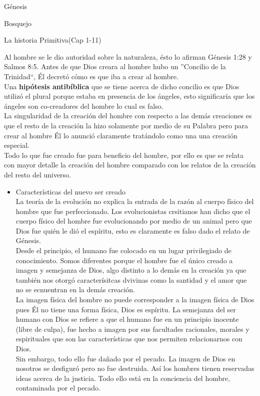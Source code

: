 \begin{section}{Génesis}
\begin{subsection}{Bosquejo}
\begin{subsubsection}{La historia Primitiva(Cap 1-11)}
\begin{enumerate}
\begin{itemize}
Al hombre se le dio autoridad sobre la naturaleza, ésto lo afirman Génesis 1:28 y Salmos 8:5. Antes de que Dios	creara al hombre hubo un ''Concilio de la Trinidad``, Él decretó cómo es que iba a crear al hombre.\\
				Una \textbf{hipótesis antibíblica} que se tiene acerca de dicho concilio es que Dios utilizó el plural porque estaba en presencia de los ángeles, esto significaría que los ángeles son co-creadores del hombre lo cual es falso.\\
					La singularidad de la creación del hombre con respecto a las demás creaciones es que el resto 						de la creación la hizo solamente por medio de su Palabra pero para crear al hombre Él lo anunció claramente tratándolo como una una creación especial.\\
					Todo lo que fue creado fue para beneficio del hombre, por ello es que se relata con mayor detalle la creación del hombre comparado con los relatos de la creación del resto del universo.
					\begin{itemize}
					\item Características del nuevo ser creado\\
					La teoría de la evolución no explica la entrada de la razón al cuerpo físico del hombre que 						fue perfeccionado. Los evolucionistas crsitianos han dicho que el cuerpo físico del hombre 						fue evolucionando por medio de un animal pero que Dios fue quién le dió el espíritu, esto es claramente es falso dado el relato de Génesis.\\
					Desde el principio, el humano fue colocado en un lugar privilegiado de conocimiento. Somos 						diferentes porque el hombre fue el único creado a imagen y semejanza de Dios, algo distinto a 						lo demás en la creación ya que también nos otorgó caracterísitcas dvivinas como la santidad y el amor que no se ecnuentran en la demás creación.\\
					La imagen física del hombre no puede corresponder a la imagen física de Dios pues Él no	tiene una forma física, Dios es espíritu. La semejanza del ser humano con Dios se refiere a que el humano fue en un principio inocente (libre de culpa), fue hecho a imagen por sus facultades racionales, morales y espirituales que son las características que nos permiten relacionarnos con Dios.\\
Sin embargo, todo ello fue dañado por el pecado. La imagen de Dios en nosotros se desfiguró pero no fue destruida. Así los hombres tienen reservadas ideas acerca de la justicia. Todo ello está en la conciencia del hombre, contaminada por el pecado.\\

\end{itemize}
\end{itemize}
\end{enumerate}
\end{subsubsection}
\end{subsection}
\end{section}
